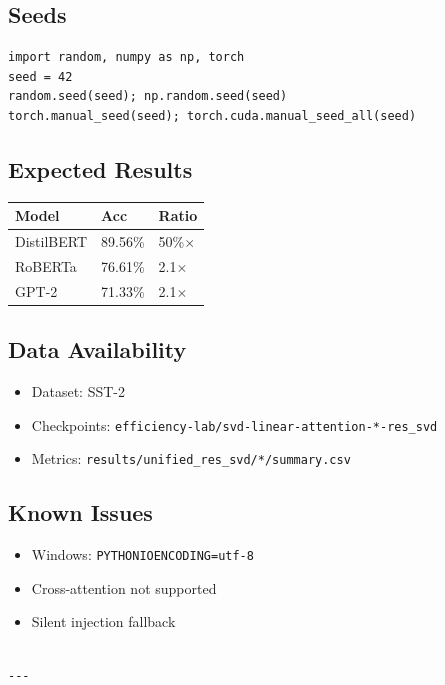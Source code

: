 \subsection{Seeds}

\begin{lstlisting}
import random, numpy as np, torch
seed = 42
random.seed(seed); np.random.seed(seed)
torch.manual_seed(seed); torch.cuda.manual_seed_all(seed)
\end{lstlisting}

\subsection{Expected Results}

\begin{table}[H]
\centering
\small
\begin{tabular}{lll}
\toprule
\textbf{Model} & \textbf{Acc} & \textbf{Ratio} \\
\midrule
DistilBERT & 89.56\% & 50\%$\times$ \\
RoBERTa & 76.61\% & 2.1$\times$ \\
GPT-2 & 71.33\% & 2.1$\times$ \\
\bottomrule
\end{tabular}
\end{table}

\subsection{Data Availability}

\begin{itemize}
\item Dataset: SST-2
\item Checkpoints: \texttt{efficiency-lab/svd-linear-attention-*-res\_svd}
\item Metrics: \texttt{results/unified\_res\_svd/*/summary.csv}

\end{itemize}
\subsection{Known Issues}

\begin{itemize}
\item Windows: \texttt{PYTHONIOENCODING=utf-8}
\item Cross-attention not supported
\item Silent injection fallback
\end{itemize}
\begin{lstlisting}

---
\end{lstlisting}


